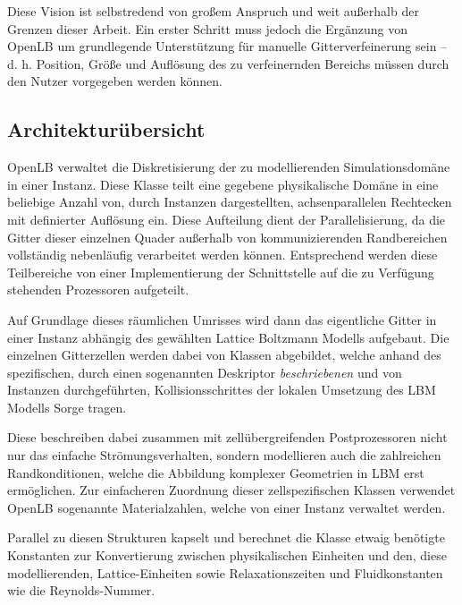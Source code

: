 Diese Vision ist selbstredend von großem Anspruch und weit außerhalb der Grenzen dieser Arbeit. Ein erster Schritt muss jedoch die Ergänzung von OpenLB um grundlegende Unterstützung für manuelle Gitterverfeinerung sein -- d. h. Position, Größe und Auflösung des zu verfeinernden Bereichs müssen durch den Nutzer vorgegeben werden können.

\subsection{Architekturübersicht}

OpenLB verwaltet die Diskretisierung der zu modellierenden Simulationsdomäne in einer  Instanz. Diese Klasse teilt eine gegebene physikalische Domäne in eine beliebige Anzahl von, durch  Instanzen dargestellten, achsenparallelen Rechtecken mit definierter Auflösung ein. Diese Aufteilung dient der Parallelisierung, da die Gitter dieser einzelnen Quader außerhalb von kommunizierenden Randbereichen vollständig nebenläufig verarbeitet werden können. Entsprechend werden diese Teilbereiche von einer Implementierung der  Schnittstelle auf die zu Verfügung stehenden Prozessoren aufgeteilt.

Auf Grundlage dieses räumlichen Umrisses wird dann das eigentliche Gitter in einer  Instanz abhängig des gewählten Lattice Boltzmann Modells aufgebaut. Die einzelnen Gitterzellen werden dabei von  Klassen abgebildet, welche anhand des spezifischen, durch einen sogenannten Deskriptor \emph{beschriebenen} und von  Instanzen durchgeführten, Kollisionsschrittes der lokalen Umsetzung des LBM Modells Sorge tragen.

Diese  beschreiben dabei zusammen mit zellübergreifenden Postprozessoren nicht nur das einfache Strömungsverhalten, sondern modellieren auch die zahlreichen Randkonditionen, welche die Abbildung komplexer Geometrien in LBM erst ermöglichen.
Zur einfacheren Zuordnung dieser zellspezifischen Klassen verwendet OpenLB sogenannte Materialzahlen, welche von einer  Instanz verwaltet werden.

Parallel zu diesen Strukturen kapselt und berechnet die  Klasse etwaig benötigte Konstanten zur Konvertierung zwischen physikalischen Einheiten und den, diese modellierenden, Lattice-Einheiten sowie Relaxationszeiten und Fluidkonstanten wie die Reynolds-Nummer.

